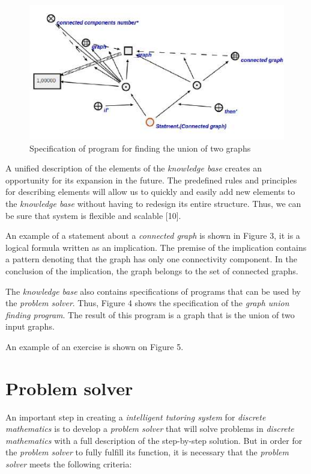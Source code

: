 \documentclass[twocolumn]{scndocument}
\begin{document}
\begin{figure}[H]
    \centering
    \includegraphics[width=0.9\linewidth]{3.jpg}
    \caption{Specification of program for finding the union of two graphs}
\end{figure}

\vspace{0.5cm}

A unified description of the elements of the \textit{knowledge base} creates an opportunity for its expansion in the future. The predefined rules and principles for describing elements will allow us to quickly and easily add new elements to the \textit{knowledge base} without having to redesign its entire structure. Thus, we can be sure that system is flexible and scalable [10].

An example of a statement about a \textit{connected graph} is shown in Figure 3, it is a logical formula written as an implication. The premise of the implication contains a pattern denoting that the graph has only one connectivity component. In the conclusion of the implication, the graph belongs to the set of connected graphs.

The \textit{knowledge base} also contains specifications of programs that can be used by the \textit{problem solver}. Thus, Figure 4 shows the specification of the \textit{graph union finding program}. The result of this program is a graph that is the union of two input graphs.

An example of an exercise is shown on Figure 5.
    \section {Problem solver}
An important step in creating a \textit{intelligent tutoring system} for \textit{discrete mathematics} is to develop a \textit{problem solver} that will solve problems in \textit{discrete mathematics} with a full description of the step-by-step solution. But in order for the \textit{problem solver} to fully fulfill its function, it is necessary that the \textit{problem solver} meets the following criteria:
\end{document}
